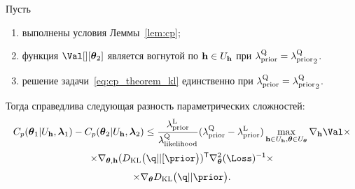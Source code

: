 \begin{theorem}
Пусть
\begin{enumerate}
\item выполнены условия Леммы~\ref{lem:cp};
\item функция $\Val[][\teta_2]$ является вогнутой по $\mathbf{h} \in U_{\mathbf{h}}$ при  $\lambda_\text{prior}^\text{Q} = {\lambda_\text{prior}^\text{Q}}_2$.
\item решение задачи~\eqref{eq:cp_theorem_kl}  единственно при  $\lambda_\text{prior}^\text{Q} = {\lambda_\text{prior}^\text{Q}}_2$.
\end{enumerate}
Тогда справедлива следующая разность параметрических сложностей:
\[
    C_p(\teta_1|\Uh, \lam_1) - C_p(\teta_2|\Uh, \lam_2)  \leq \frac{\lamCL }{\lamLL} (\lamCQ - \lamCL) \max_{\h \in \Uh, \teta \in \Uteta}  \nabla_{\h} \Val  \times
\]
\[
 \times \nabla_{\teta, \h} (\KL{\q}{[\prior})^\mathsf{T}  \nabla_{\teta}^2(\Loss)^\mathsf{-1} \times
\]
\[\times \nabla_{\teta} \KL{\q}{\prior}.
\]
\end{theorem}
